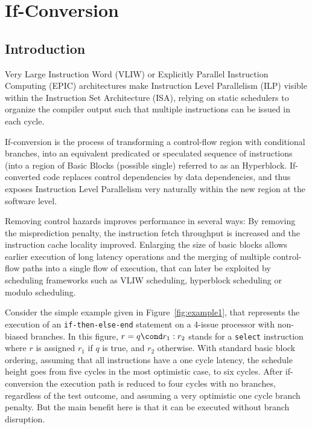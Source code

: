 \chapter{If-Conversion }
\label{chapter:if_conversion}

\newcommand{\annotation}[1]{%
  \marginpar{\small\itshape\color{red}#1}}



\section{Introduction}

 Very Large Instruction Word (VLIW) or Explicitly Parallel Instruction Computing (EPIC) architectures make Instruction Level Parallelism (ILP) visible within the Instruction Set Architecture (ISA), relying on static schedulers to organize the compiler output such that multiple instructions can be issued in each cycle.

If-conversion is the process of transforming a control-flow region with conditional branches, into an equivalent predicated or speculated sequence of instructions (into a region of Basic Blocks (possible single) referred to as an Hyperblock. 
If-converted code replaces control dependencies by data dependencies, and thus exposes Instruction Level Parallelism very naturally within the new region at the software level.

Removing control hazards improves performance in several ways: 
By removing the misprediction penalty, the instruction fetch throughput is increased and the instruction cache locality improved. 
Enlarging the size of basic blocks allows earlier execution of long latency operations and the merging of multiple control-flow paths into a single flow of execution, that can later be exploited by scheduling frameworks such as VLIW scheduling, hyperblock scheduling or modulo scheduling.

Consider the simple example given in Figure~\ref{fig:example1}, that represents the execution of an \texttt{if-then-else-end} statement on a 4-issue processor with non-biased branches. 
In this figure, $r=q\cond r_1:r_2$ stands for a \texttt{select} instruction where $r$ is assigned $r_1$ if $q$ is true, and $r_2$ otherwise. 
With standard basic block ordering, assuming that all instructions have a one cycle latency, the schedule height goes from five cycles in the most optimistic case, to six cycles. 
After if-conversion the execution path is reduced to four cycles with no branches, regardless of the test outcome, and assuming a very optimistic one cycle branch penalty. 
But the main benefit here is that it can be executed without branch disruption.

